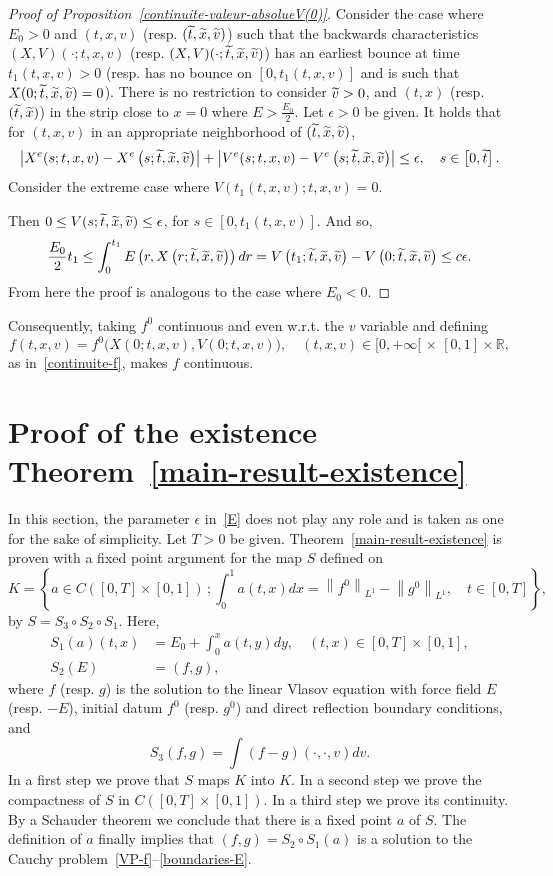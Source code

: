 \documentclass[10pt]{amsart}
\theoremstyle{definition}\newtheorem{defi}[theo]{Definition}\newtheorem{rema}[theo]{Remark}\newtheorem{exam}[theo]{Example}\newtheorem{exem}[theo]{Example}\newtheorem{nota}[theo]{Notation}
\newcommand{\R}{\mathbb{R}}
\let\oldtilde\tilde
\renewcommand*{\tilde}[1]{\mathchoice{\widetilde{#1}}{\widetilde{#1}}{\oldtilde{#1}}{\oldtilde{#1}}}
\begin{document}
\begin{proof}[{Proof of Proposition~\ref{continuite-valeur-absolueV(0)}}]
Consider the case where $E_0>0$ and $(t,x,v)$ (resp. $(\tilde{t},\tilde{x},\tilde{v})$) such that the backwards characteristics $(X,V)(\cdot;t,x,v)$ (resp. $(X,V)(\cdot;\tilde{t},\tilde{x},\tilde{v})$) has an earliest bounce at time $t_1(t,x,v)>0$ (resp. has no bounce on $[0,t_1(t,x,v)]$ and is such that $X(0;\tilde{t},\tilde{x},\tilde{v})= 0$). There is no restriction to consider $\tilde{v}>0$, and $(t,x)$ (resp. $(\tilde{t},\tilde{x})$) in the strip close to $x=0$ where $E>\frac{E_0}{2}$. Let $\epsilon >0$ be given. It holds that for $(t,x,v)$ in an appropriate neighborhood of $(\tilde{t},\tilde{x},\tilde{v})$,
\[
\left|X^e(s;t,x,v)-X^e\left(s;\tilde{t},\tilde{x},\tilde{v}\right)\right|+\left|V^e(s;t,x,v)-V^e\left(s;\tilde{t},\tilde{x},\tilde{v}\right)\right|\leq \epsilon, \quad s \in \left[0,\tilde{t}\right].
\]
Consider the extreme case where $V(t_1(t,x,v);t,x,v)= 0$.


Then $0 \leq V(s;\tilde{t},\tilde{x},\tilde{v})\leq \epsilon $, for $s\in [0,t_1(t,x,v)]$. And so,
\[
\frac{E_0}{2} t_1\leq \int_0^{t_1} E\left(r,X\left(r;\tilde{t},\tilde{x},\tilde{v}\right)\right)dr = V\left(t_1;\tilde{t},\tilde{x},\tilde{v}\right)-V\left(0;\tilde{t},\tilde{x},\tilde{v}\right) \leq c\epsilon.
\]
From here the proof is analogous to the case where $E_0<0$.
\end{proof}
Consequently, taking $f^0$ continuous and even w.r.t. the $v$ variable and defining
\[
f(t,x,v)=f^0\big(X(0;t,x,v),V(0;t,x,v)\big),\quad (t,x,v)\in [0,+\infty[\,\times\,[0,1] \times \R,
\]
as in~\eqref{continuite-f}, makes $f$ continuous.



\section{Proof of the existence Theorem~\ref{main-result-existence}}\label{pf-main-result-existence}


In this section, the parameter $\epsilon $ in~\eqref{E} does not play any role and is taken as one for the sake of simplicity. Let $T>0$ be given. Theorem~\ref{main-result-existence} is proven with a fixed point argument for the map $S$ defined on
\[
K = \left\{ a \in C([0,T] \times [0,1]) \, ; \int_0^1 a(t,x)dx = \left\|f^0\right\|_{L^1} - \left\|g^0\right\|_{L^1},\quad t\in [0,T] \right \},
\]
by $S= S_3 \circ S_2 \circ S_1$. Here,
\begin{align*}
S_1(a)(t,x) &= E_0 +\int_0^x a(t,y)dy, \quad (t,x)\in [0,T] \times [0,1],\\
S_2(E) &= (f,g),
\end{align*}
where $f$ (resp. $g$) is the solution to the linear Vlasov equation with force field $E$ (resp. $-E$), initial datum $f^0$ (resp. $g^0$) and direct reflection boundary conditions, and
\[
S_3(f,g) = \int (f-g)(\cdot, \cdot, v)dv.
\]
In a first step we prove that $S$ maps $K$ into $K$. In a second step we prove the compactness of $S$ in $C([0,T] \times [0,1])$. In a third step we prove its continuity. By a Schauder theorem we conclude that there is a fixed point $a$ of $S$. The definition of $a$ finally implies that $(f,g)= S_2\circ S_1(a)$ is a solution to the Cauchy problem~\eqref{VP-f}--\eqref{boundaries-E}.
\end{document}
